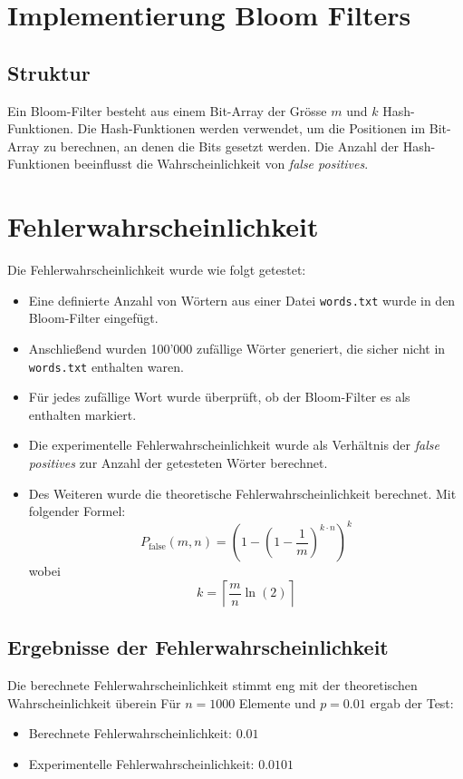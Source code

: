 \documentclass[a4paper, 12pt]{article}
\begin{document}
\section{Implementierung Bloom Filters}\label{sec:implementierung-bloom-filters}
\subsection{Struktur}\label{subsec:struktur}
Ein Bloom-Filter besteht aus einem Bit-Array der Grösse $m$ und $k$ Hash-Funktionen.
Die Hash-Funktionen werden verwendet, um die Positionen im Bit-Array zu berechnen, an denen die Bits gesetzt werden.
Die Anzahl der Hash-Funktionen beeinflusst die Wahrscheinlichkeit von \textit{false positives}.

\section{Fehlerwahrscheinlichkeit}
Die Fehlerwahrscheinlichkeit wurde wie folgt getestet:
\begin{itemize}
    \item Eine definierte Anzahl von Wörtern aus einer Datei \texttt{words.txt} wurde in den Bloom-Filter eingefügt.
    \item Anschließend wurden 100'000 zufällige Wörter generiert, die sicher nicht in \texttt{words.txt} enthalten waren.
    \item Für jedes zufällige Wort wurde überprüft, ob der Bloom-Filter es als enthalten markiert.
    \item Die experimentelle Fehlerwahrscheinlichkeit wurde als Verhältnis der \textit{false positives} zur Anzahl der getesteten Wörter berechnet.
    \item Des Weiteren wurde die theoretische Fehlerwahrscheinlichkeit berechnet. Mit folgender Formel:
    \[
        P_{\text{false}}(m, n) = \left( 1 - \left( 1 - \frac{1}{m} \right)^{k \cdot n} \right)^k
    \]
    wobei
    \[
        k = \left\lceil \frac{m}{n} \ln(2) \right\rceil
    \]
\end{itemize}

\subsection{Ergebnisse der Fehlerwahrscheinlichkeit}\label{subsec:ergebnisse-der-fehlerwahrscheinlichkeit}
Die berechnete Fehlerwahrscheinlichkeit stimmt eng mit der theoretischen Wahrscheinlichkeit überein
Für $n = 1000$ Elemente und $p = 0.01$ ergab der Test:
\begin{itemize}
    \item Berechnete Fehlerwahrscheinlichkeit: $0.01$
    \item Experimentelle Fehlerwahrscheinlichkeit: $0.0101$
\end{itemize}
\end{document}
